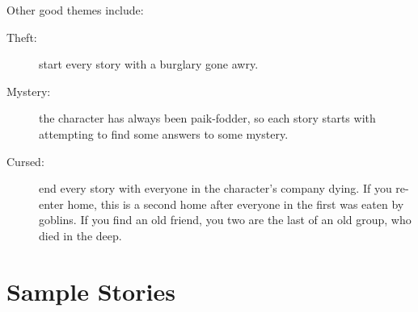 \begin{multicols}{2}
Other good themes include:

\begin{description}
  \item[Theft:]
  start every story with a burglary gone awry.
  \item[Mystery:]
  the character has always been \gls{paik}-fodder, so each story starts with attempting to find some answers to some mystery.
  \item[Cursed:]
  end every story with everyone in the character's company dying.
  If you re-enter home, this is a second home after everyone in the first was eaten by goblins.
  If you find an old friend, you two are the last of an old group, who died in the \gls{deep}.
\end{description}

\end{multicols}

\section{Sample Stories}


